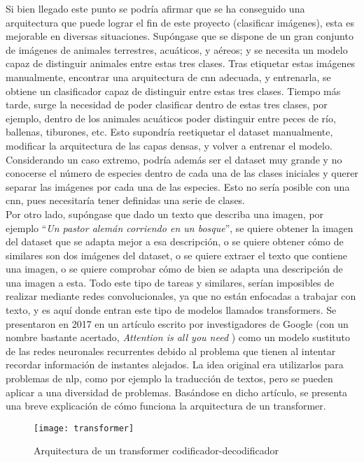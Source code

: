 			Si bien llegado este punto se podría afirmar que se ha conseguido una arquitectura que puede lograr el fin de este proyecto (clasificar imágenes), esta es mejorable en diversas situaciones. Supóngase que se dispone de un gran conjunto de imágenes de animales terrestres, acuáticos, y aéreos; y se necesita un modelo capaz de distinguir animales entre estas tres clases. Tras etiquetar estas imágenes manualmente, encontrar una arquitectura de \gls{cnn} adecuada, y entrenarla, se obtiene un clasificador capaz de distinguir entre estas tres clases. Tiempo más tarde, surge la necesidad de poder clasificar dentro de estas tres clases, por ejemplo, dentro de los animales acuáticos poder distinguir entre peces de río, ballenas, tiburones, etc. Esto supondría reetiquetar el dataset manualmente, modificar la arquitectura de las capas densas, y volver a entrenar el modelo. Considerando un caso extremo, podría además ser el dataset muy grande y no conocerse el número de especies dentro de cada una de las clases iniciales y querer separar las imágenes por cada una de las especies. Esto no sería posible con una \gls{cnn}, pues necesitaría tener definidas una serie de clases. \\
			
			Por otro lado, supóngase que dado un texto que describa una imagen, por ejemplo ``\textit{Un pastor alemán corriendo en un bosque}'', se quiere obtener la imagen del dataset que se adapta mejor a esa descripción, o se quiere obtener cómo de similares son dos imágenes del dataset, o se quiere extraer el texto que contiene una imagen, o se quiere comprobar cómo de bien se adapta una descripción de una imagen a esta. Todo este tipo de tareas y similares, serían imposibles de realizar mediante redes convolucionales, ya que no están enfocadas a trabajar con texto, y es aquí donde entran este tipo de modelos llamados transformers. Se presentaron en 2017 en un artículo escrito por investigadores de Google (con un nombre bastante acertado, \textit{Attention is all you need} \cite{attention}) como un modelo sustituto de las redes neuronales recurrentes debido al problema que tienen al intentar recordar información de instantes alejados. La idea original era utilizarlos para problemas de \gls{nlp}, como por ejemplo la traducción de textos, pero se pueden aplicar a una diversidad de problemas. Basándose en dicho artículo, se presenta una breve explicación de cómo funciona la arquitectura de un transformer. \\
			
			\begin{figure}
				\centering
				\texttt{[image: transformer]}
				\caption{Arquitectura de un transformer codificador-decodificador \cite{attention}}
				\label{fig:arq_transf}
			\end{figure}
			
